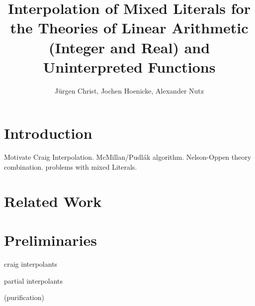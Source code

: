 \documentclass{llncs}
\title{Interpolation of Mixed Literals for the Theories of 
Linear Arithmetic (Integer and Real)  and Uninterpreted Functions}
\author{J\"urgen Christ, Jochen Hoenicke, Alexander Nutz}
\begin{document}
\maketitle


\section{Introduction}

Motivate Craig Interpolation.
McMillan/Pudl\'ak algorithm.
Nelson-Oppen theory combination.
problems with mixed Literals.


\section{Related Work}

\section{Preliminaries}

craig interpolants

partial interpolants 

(purification)
\end{document}
